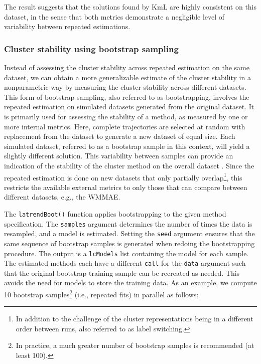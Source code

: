The result suggests that the solutions found by KmL are highly consistent on this dataset, in the sense that both metrics demonstrate a negligible level of variability between repeated estimations.

\subsubsection{Cluster stability using bootstrap sampling}\label{cluster-stability-using-bootstrap-sampling}

Instead of assessing the cluster stability across repeated estimation on the same dataset, we can obtain a more generalizable estimate of the cluster stability in a nonparametric way by measuring the cluster stability across different datasets. This form of bootstrap sampling, also referred to as bootstrapping, involves the repeated estimation on simulated datasets generated from the original dataset. It is primarily used for assessing the stability of a method, as measured by one or more internal metrics. Here, complete trajectories are selected at random with replacement from the dataset to generate a new dataset of equal size. Each simulated dataset, referred to as a bootstrap sample in this context, will yield a slightly different solution. This variability between samples can provide an indication of the stability of the cluster method on the overall dataset \citep{hennig2007clusterwise}. Since the repeated estimation is done on new datasets that only partially overlap\footnote{In addition to the challenge of the cluster representations being in a different order between runs, also referred to as label switching.}, this restricts the available external metrics to only those that can compare between different datasets, e.g., the WMMAE.

The \texttt{latrendBoot()} function applies bootstrapping to the given method specification. The \texttt{samples} argument determines the number of times the data is resampled, and a model is estimated. Setting the \texttt{seed} argument ensures that the same sequence of bootstrap samples is generated when redoing the bootstrapping procedure. The output is a \texttt{lcModels} list containing the model for each sample. The estimated methods each have a different \texttt{call} for the \texttt{data} argument such that the original bootstrap training sample can be recreated as needed. This avoids the need for models to store the training data. As an example, we compute 10 bootstrap samples\footnote{In practice, a much greater number of bootstrap samples is recommended (at least 100).} (i.e., repeated fits) in parallel as follows:

